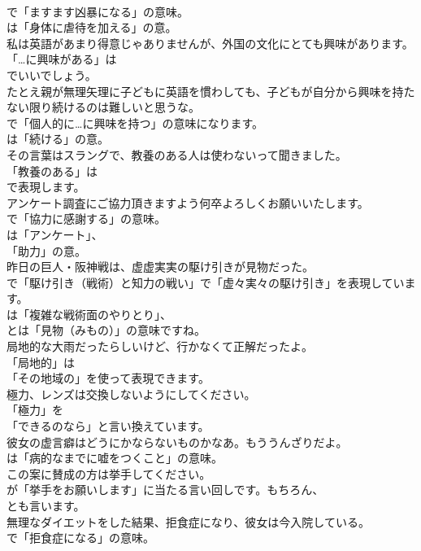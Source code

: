 \documentclass[8pt]{extreport}
\begin{document}
\begin{CJK}{UTF8}{min}
\\	で「ますます凶暴になる」の意味。
\\	は「身体に虐待を加える」の意。	
\\	私は英語があまり得意じゃありませんが、外国の文化にとても興味があります。 
\\	「…に興味がある」は
\\	でいいでしょう。	
\\	たとえ親が無理矢理に子どもに英語を慣わしても、子どもが自分から興味を持たない限り続けるのは難しいと思うな。 
\\	で「個人的に…に興味を持つ」の意味になります。
\\	は「続ける」の意。	
\\	その言葉はスラングで、教養のある人は使わないって聞きました。 
\\	「教養のある」は 
\\	で表現します。	
\\	アンケート調査にご協力頂きますよう何卒よろしくお願いいたします。 
\\	で「協力に感謝する」の意味。
\\	は「アンケート」、
\\	「助力」の意。	
\\	昨日の巨人・阪神戦は、虚虚実実の駆け引きが見物だった。 
\\	で「駆け引き（戦術）と知力の戦い」で「虚々実々の駆け引き」を表現しています。
\\	は「複雑な戦術面のやりとり」、
\\	とは「見物（みもの）」の意味ですね。	
\\	局地的な大雨だったらしいけど、行かなくて正解だったよ。 
\\	「局地的」は
\\	「その地域の」を使って表現できます。	
\\	極力、レンズは交換しないようにしてください。 
\\	「極力」を
\\	「できるのなら」と言い換えています。	
\\	彼女の虚言癖はどうにかならないものかなあ。もううんざりだよ。 
\\	は「病的なまでに嘘をつくこと」の意味。	
\\	この案に賛成の方は挙手してください。 
\\	が「挙手をお願いします」に当たる言い回しです。もちろん、
\\	とも言います。	
\\	無理なダイエットをした結果、拒食症になり、彼女は今入院している。 
\\	で「拒食症になる」の意味。

\end{CJK}
\end{document}
